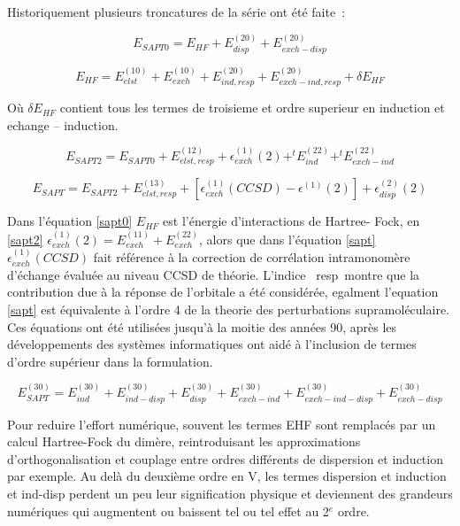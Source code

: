 Historiquement plusieurs troncatures de la série ont été faite :

\begin{equation}
E_{SAPT0} = E_{HF} + E_{disp}^{(20)} + E_{exch-disp}^{(20)} \label{sapt0}
\end{equation}

\begin{equation}
E_{HF} = E_{elst}^{(10)} + E_{exch}^{(10)} + E_{ind,resp}^{(20)} + E_{exch-ind,resp}^{(20)} + \delta E_{HF}
\end{equation}

Où $\delta E_{HF}$ contient tous les termes de troisieme et ordre superieur en induction et echange – induction. 

\begin{equation}
E_{SAPT2} = E_{SAPT0} + E_{elst,resp}^{(12)} + \epsilon_{exch}^{(1)} (2) + ^{t}E_{ind}^{(22)} + ^{t}E_{exch-ind}^{(22)} \label{sapt2}
\end{equation}

\begin{equation}
E_{SAPT} = E_{SAPT2} + E_{elst,resp}^{(13)} + [\epsilon_{exch}^{(1)} (CCSD) - \epsilon^{(1)}(2)] + \epsilon_{disp}^{(2)}(2) \label{sapt}
\end{equation}

Dans l’équation \ref{sapt0} $E_{HF}$ est l’énergie d’interactions de Hartree- Fock, en \ref{sapt2} $\epsilon_{exch}^{(1)}(2) = E_{exch}^{(11)} + E_{exch}^{(22)}$, alors que dans l’équation \ref{sapt}  $\epsilon_{exch}^{(1)}(CCSD)$ fait référence à la correction de corrélation intramonomère d’échange évaluée au niveau CCSD de théorie. L’indice \og resp \fg montre que la contribution due à la réponse de l’orbitale a été considérée, egalment l'equation \ref{sapt} est équivalente à l'ordre 4 de la theorie des perturbations supramoléculaire. Ces équations ont été utilisées jusqu'à la moitie des années 90, après les développements des systèmes informatiques ont aidé à l’inclusion de termes d’ordre supérieur dans la formulation.

\begin{equation}
E_{SAPT}^{(30)} = E_{ind}^{(30)} + E_{ind-disp}^{(30)} + E_{disp}^{(30)} + E_{exch-ind}^{(30)} + E_{exch-ind-disp}^{(30)} + E_{exch-disp}^{(30)}
\end{equation}

Pour reduire l’effort numérique, souvent les termes EHF sont remplacés par un calcul Hartree-Fock du dimère, reintroduisant les approximations d’orthogonalisation et couplage entre ordres différents de dispersion et induction par exemple.
Au delà du deuxième ordre en V, les termes dispersion et induction et ind-disp perdent un peu leur signification physique et deviennent des grandeurs numériques qui augmentent ou baissent tel ou tel effet au 2$^{e}$ ordre.

